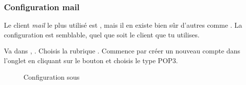 \subsubsection{Configuration mail}

 Le client \emph{mail} le plus
utilisé est , mais il en existe bien sûr d'autres comme
. La configuration est semblable, quel que soit le
client que tu utilises.

Va dans , . Choisis la
rubrique . Commence par créer un nouveau compte dans
l'onglet  en cliquant sur le bouton
 et choisis le type POP3.


\noindent
  \begin{figure}[!h]
    \begin{center}  
         	 \caption{Configuration sous }
    \end{center}
  \end{figure}


